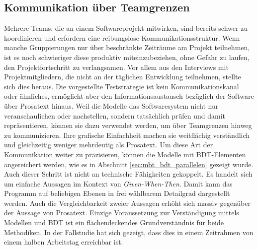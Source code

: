 \subsection{Kommunikation über Teamgrenzen}
Mehrere Teams, die an einem Softwareprojekt mitwirken, sind bereits schwer zu koordinieren und erfordern eine reibungslose Kommunikationsstruktur. Wenn manche Gruppierungen nur über beschränkte Zeiträume am Projekt teilnehmen, ist es noch schwieriger diese produktiv miteinzubeziehen, ohne Gefahr zu laufen, den Projektfortschritt zu verlangsamen. Vor allem aus den Interviews mit Projektmitgliedern, die nicht an der täglichen Entwicklung teilnehmen, stellte sich dies heraus. Die vorgestellte Teststrategie ist kein Kommunikationskanal oder ähnliches, ermöglicht aber den Informationsaustausch bezüglich der Software über Prosatext hinaus. Weil die Modelle das Softwaresystem nicht nur veranschaulichen oder nachstellen, sondern tatsächlich prüfen und damit repräsentieren, können sie dazu verwendet werden, um über Teamgrenzen hinweg zu kommunizieren. Ihre grafische Einfachheit machen sie weitflächig verständlich und gleichzeitig weniger mehrdeutig als Prosatext. Um diese Art der Kommunikation weiter zu präzisieren, können die Modelle mit \Gls{BDT}-Elementen angereichert werden, wie es in Abschnitt \ref{sec:mbt_bdt_parallelen} gezeigt wurde. Auch dieser Schritt ist nicht an technische Fähigkeiten gekoppelt. Es handelt sich um einfache Aussagen im Kontext von \textit{Given-When-Then}. Damit kann das Programm auf beliebigen Ebenen in frei wählbarem Detailgrad dargestellt werden. Auch die Vergleichbarkeit zweier Aussagen erhöht sich massiv gegenüber der Aussage von Prosatext. Einzige Voraussetzung zur Verständigung mittels Modellen und \Gls{BDT} ist ein flächendeckendes Grundverständnis für beide Methodiken. In der Fallstudie hat sich gezeigt, dass dies in einem Zeitrahmen von einem halben Arbeitstag erreichbar ist.

